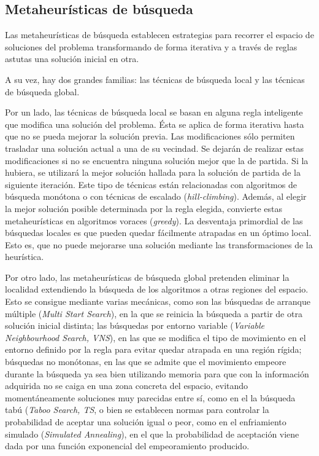 \subsection{Metaheurísticas de búsqueda}
Las metaheurísticas de búsqueda establecen estrategias para recorrer el espacio de soluciones del problema transformando de forma iterativa y a través de reglas astutas una solución inicial en otra.

A su vez, hay dos grandes familias: las técnicas de búsqueda local y las técnicas de búsqueda global.

Por un lado, las técnicas de búsqueda local se basan en alguna regla inteligente que modifica una solución del problema. Ésta se aplica de forma iterativa hasta que no se pueda mejorar la solución previa.
Las modificaciones sólo permiten trasladar una solución actual a una de su vecindad. Se dejarán de realizar estas modificaciones si no se encuentra ninguna solución mejor que la de partida. Si la hubiera, se utilizará la mejor solución hallada para la solución de partida de la siguiente iteración.
Este tipo de técnicas están relacionadas con algoritmos de búsqueda monótona o con técnicas de escalado (\textit{hill-climbing}). Además, al elegir la mejor solución posible determinada por la regla elegida, convierte estas metaheurísticas en algoritmos voraces (\textit{greedy}).
La desventaja primordial de las búsquedas locales es que pueden quedar fácilmente atrapadas en un óptimo local. Esto es, que no puede mejorarse una solución mediante las transformaciones de la heurística.

Por otro lado, las metaheurísticas de búsqueda global pretenden eliminar la localidad extendiendo la búsqueda de los algoritmos a otras regiones del espacio. Esto se consigue mediante varias mecánicas, como son las búsquedas de arranque múltiple (\textit{Multi Start Search}), en la que se reinicia la búsqueda a partir de otra solución inicial distinta; las búsquedas por entorno variable (\textit{Variable Neighbourhood Search, VNS}), en las que se modifica el tipo de movimiento en el entorno definido por la regla para evitar quedar atrapada en una región rígida; búsquedas no monótonas, en las que se admite que el movimiento empeore durante la búsqueda ya sea bien utilizando memoria para que con la información adquirida no se caiga en una zona concreta del espacio, evitando momentáneamente soluciones muy parecidas entre sí, como en el la búsqueda tabú (\textit{Taboo Search, TS}, o bien se establecen normas para controlar la probabilidad de aceptar una solución igual o peor, como en el enfriamiento simulado (\textit{Simulated Annealing}), en el que la probabilidad de aceptación viene dada por una función exponencial del empeoramiento producido.

